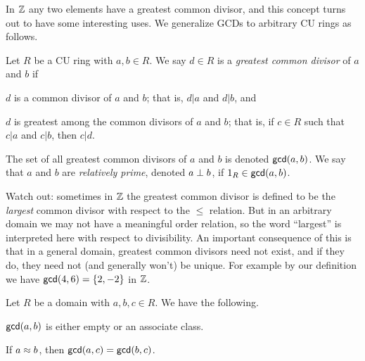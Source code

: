 In \(\mathbb{Z}\) any two elements have a greatest common divisor, and this concept turns out to have some interesting uses. We generalize GCDs to arbitrary CU rings as follows.

\begin{dfn}
Let \(R\) be a CU ring with \(a,b \in R\). We say \(d \in R\) is a \emph{greatest common divisor} of \(a\) and \(b\) if 
\begin{proplist}
\item \(d\) is a common divisor of \(a\) and \(b\); that is, \(d|a\) and \(d|b\), and 
\item \(d\) is greatest among the common divisors of \(a\) and \(b\); that is, if \(c \in R\) such that \(c|a\) and \(c|b\), then \(c|d\).
\end{proplist}
The set of all greatest common divisors of \(a\) and \(b\) is denoted \(\mathsf{gcd}(a, b)\). We say that \(a\) and \(b\) are \emph{relatively prime}, denoted \(a \perp b\), if \(1_R \in \mathsf{gcd}(a, b)\). 
\end{dfn}

Watch out: sometimes in \(\mathbb{Z}\) the greatest common divisor is defined to be the \emph{largest} common divisor with respect to the \(\leq\) relation. But in an arbitrary domain we may not have a meaningful order relation, so the word ``largest'' is interpreted here with respect to divisibility. An important consequence of this is that in a general domain, greatest common divisors need not exist, and if they do, they need not (and generally won't) be unique. For example by our definition we have \(\mathsf{gcd}(4, 6) = \{2, -2\}\) in \(\mathbb{Z}\).

\begin{prop} \label{prop:gcd-assoc}
Let \(R\) be a domain with \(a,b,c \in R\). We have the following.
\begin{proplist*}
\item \(\mathsf{gcd}(a, b)\) is either empty or an associate class. \label{prop:gcd-assoc:class}
\item If \(a \approx b\), then \(\mathsf{gcd}(a, c) = \mathsf{gcd}(b, c)\). \label{prop:gcd-assoc:well-defined}
\end{proplist*}
\end{prop}


